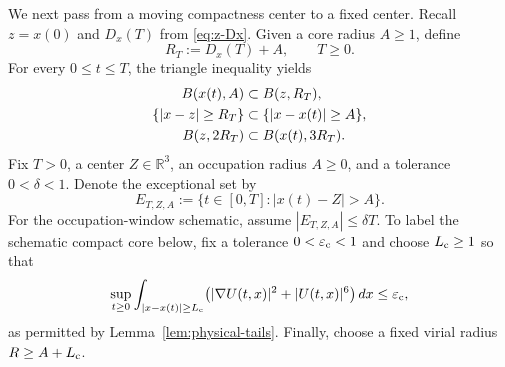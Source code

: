 \documentclass[preprint,12pt]{elsarticle}
\numberwithin{equation}{section}
\theoremstyle{remark}
\newcommand{\R}{\mathbb R}
\newcommand{\eps}{\varepsilon}
\newcommand{\dd}{\,d}
\begin{document}
We next pass from a moving compactness center to a fixed center. Recall $z=x(0)$ and $D_x(T)$ from \eqref{eq:z-Dx}. Given a core radius $A\ge1$, define
\begin{equation}\label{eq:RT-def}
  R_T:=D_x(T)+A,
  \qquad T\ge0.
\end{equation}
For every $0\le t\le T$, the triangle inequality yields
\begin{align}
  B(x(t),A)&\subset B(z,R_T),
  \notag\\
  \{|x-z|\ge R_T\}&\subset\{|x-x(t)|\ge A\},
  \label{eq:fixed-moving-tail-inclusion}\\
  B(z,2R_T)&\subset B(x(t),3R_T).
  \notag
\end{align}
Fix $T>0$, a center $Z\in\R^3$, an occupation radius $A\ge0$, and a tolerance $0<\delta<1$. Denote the exceptional set by
\[
  E_{T,Z,A}:=\{t\in[0,T]:|x(t)-Z|>A\}.
\]
For the occupation-window schematic, assume $|E_{T,Z,A}|\le\delta T$.
To label the schematic compact core below, fix a tolerance $0<\eps_{\rm c}<1$ and choose $L_{\rm c}\ge1$ so that
\begin{equation*}
  \sup_{t\ge0}
  \int_{|x-x(t)|\ge L_{\rm c}}
  \bigl(|\nabla U(t,x)|^2+|U(t,x)|^6\bigr)\dd x
  \le\eps_{\rm c},
\end{equation*}
as permitted by Lemma~\ref{lem:physical-tails}. Finally, choose a fixed virial radius $R\ge A+L_{\rm c}$.
\end{document}
